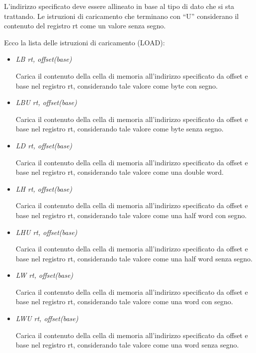 \documentclass[letterpaper,10pt,italian]{sphinxmanual}
\begin{document}
L'indirizzo specificato deve essere allineato in base al tipo di dato che si
sta trattando.  Le istruzioni di caricamento che terminano con ``U'' considerano
il contenuto del registro rt come un valore senza segno.

Ecco la lista delle istruzioni di caricamento (LOAD):
\begin{itemize}
\item {} 
\emph{LB rt, offset(base)}

Carica il contenuto della cella di memoria all'indirizzo specificato da
offset e base nel registro rt, considerando tale valore come byte con segno.

\item {} 
\emph{LBU rt, offset(base)}

Carica il contenuto della cella di memoria all'indirizzo specificato da
offset e base nel registro rt, considerando tale valore come byte senza
segno.

\item {} 
\emph{LD rt, offset(base)}

Carica il contenuto della cella di memoria all'indirizzo specificato da
offset e base nel registro rt, considerando tale valore come una double
word.

\item {} 
\emph{LH rt, offset(base)}

Carica il contenuto della cella di memoria all'indirizzo specificato da
offset e base nel registro rt, considerando tale valore come una half word
con segno.

\item {} 
\emph{LHU rt, offset(base)}

Carica il contenuto della cella di memoria all'indirizzo specificato da
offset e base nel registro rt, considerando tale valore come una half word
senza segno.

\item {} 
\emph{LW rt, offset(base)}

Carica il contenuto della cella di memoria all'indirizzo specificato da
offset e base nel registro rt, considerando tale valore come una word con
segno.

\item {} 
\emph{LWU rt, offset(base)}

Carica il contenuto della cella di memoria all'indirizzo specificato da
offset e base nel registro rt, considerando tale valore come una word senza
segno.

\end{itemize}
\end{document}
